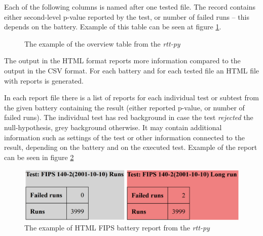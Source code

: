 \documentclass[
  digital,     %
  oneside,     %
  nosansbold,  %
  nocolorbold, %
  nolof,         %
  nolot,         %
]{fithesis4}
\begin{document}
Each of the following columns is named after one tested file. The record contains either second-level p-value reported by the test, or number of failed runs -- this depends on the battery. Example of this table can be seen at figure \ref{fig:rtt_py_table}.

\begin{figure}
  \begin{center}
  \end{center}
  \caption{The example of the overview table from the \emph{rtt-py}}
  \label{fig:rtt_py_table}
\end{figure}


The output in the HTML format reports more information compared to the output in the CSV format. For each battery and for each tested file an HTML file with reports is generated.

In each report file there is a list of reports for each individual test or subtest from the given battery containing the result (either reported p-value, or number of failed runs). The individual test has red background in case the test \emph{rejected} the null-hypothesis, grey background otherwise. It may contain additional information such as settings of the test or other information connected to the result, depending on the battery and on the executed test. Example of the  report can be seen in figure \ref{fig:rtt_py_html}
\begin{figure}
  \begin{center}
    \includegraphics[width=12.5cm]{figures/rtt-py.png}
  \end{center}
  \caption{The example of HTML FIPS battery report from the \emph{rtt-py}}
  \label{fig:rtt_py_html}
\end{figure}
\end{document}
